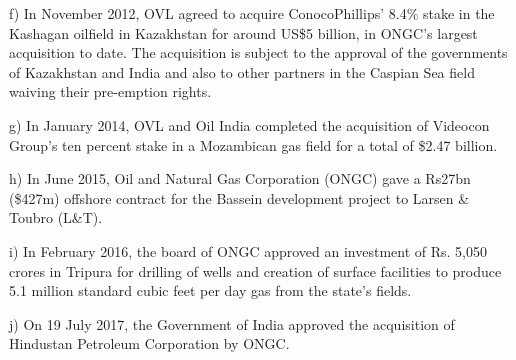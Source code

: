 f) In November 2012, OVL agreed to acquire ConocoPhillips' 8.4\% stake in the Kashagan oilfield in Kazakhstan for around US\$5 billion, in ONGC's largest acquisition to date. The acquisition is subject to the approval of the governments of Kazakhstan and India and also to other partners in the Caspian Sea field waiving their pre-emption rights.

g) In January 2014, OVL and Oil India completed the acquisition of Videocon Group's ten percent stake in a Mozambican gas field for a total of \$2.47 billion.

h) In June 2015, Oil and Natural Gas Corporation (ONGC) gave a Rs27bn (\$427m) offshore contract for the Bassein development project to Larsen \& Toubro (L\&T).

i) In February 2016, the board of ONGC approved an investment of Rs. 5,050 crores in Tripura for drilling of wells and creation of surface facilities to produce 5.1 million standard cubic feet per day gas from the state's fields.

j) On 19 July 2017, the Government of India approved the acquisition of Hindustan Petroleum Corporation by ONGC.


